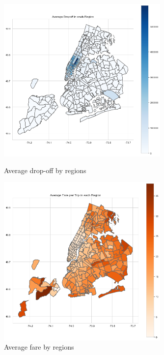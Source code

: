 \documentclass[11pt]{article}
\begin{document}
\begin{figure}[h]
\centering
\begin{minipage}[t]{0.48\textwidth}
\leftin
    \includegraphics[width=0.75\textwidth]{plots/map1.png}
    \caption{Average drop-off by regions}
\end{minipage}
\begin{minipage}[t]{0.48\textwidth}
\centering
    \includegraphics[width=0.75\textwidth]{plots/map2.png}
    \caption{Average fare by regions}
\end{minipage}
\begin{minipage}[t]{0.48\textwidth}
\centering

\end{minipage}
\end{figure}
\end{document}
